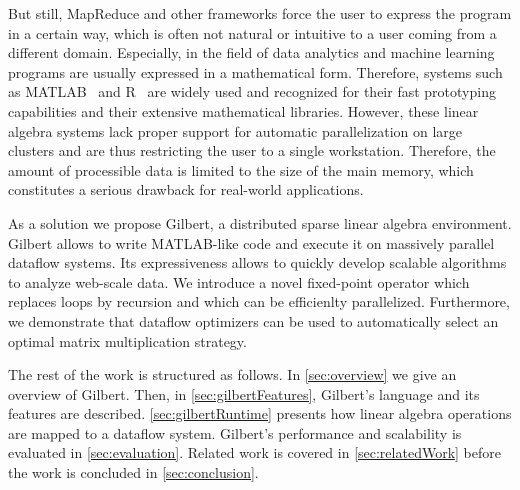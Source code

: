 But still, MapReduce and other frameworks force the user to express the program in a certain way, which is often not natural or intuitive to a user coming from a different domain.
Especially, in the field of data analytics and machine learning programs are usually expressed in a mathematical form.
Therefore, systems such as MATLAB~\cite{matlab} and R~\cite{r:1993a} are widely used and recognized for their fast prototyping capabilities and their extensive mathematical libraries.
However, these linear algebra systems lack proper support for automatic parallelization on large clusters and are thus restricting the user to a single workstation.
Therefore, the amount of processible data is limited to the size of the main memory, which constitutes a serious drawback for real-world applications.

As a solution we propose Gilbert, a distributed sparse linear algebra environment.
Gilbert allows to write MATLAB-like code and execute it on massively parallel dataflow systems.
Its expressiveness allows to quickly develop scalable algorithms to analyze web-scale data.
We introduce a novel fixed-point operator which replaces loops by recursion and which can be efficienlty parallelized.
Furthermore, we demonstrate that dataflow optimizers can be used to automatically select an optimal matrix multiplication strategy.

The rest of the work is structured as follows.
In \cref{sec:overview} we give an overview of Gilbert.
Then, in \cref{sec:gilbertFeatures}, Gilbert's language and its features are described.
\cref{sec:gilbertRuntime} presents how linear algebra operations are mapped to a dataflow system.
Gilbert's performance and scalability is evaluated in \cref{sec:evaluation}.
Related work is covered in \cref{sec:relatedWork} before the work is concluded in \cref{sec:conclusion}.